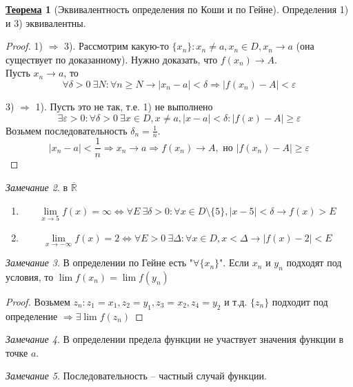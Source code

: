 \documentclass[12pt]{article}
\newenvironment{MyList}[1][4pt]{
  \begin{enumerate}[1.]
  \setlength{\parskip}{0pt}
  \setlength{\itemsep}{#1}
}{       
  \end{enumerate}
}
\def\R{\mathbb{R}}       %
\def\SO{\Rightarrow}     %
\def\EQ{\Leftrightarrow} %
\def\Pagebreak{\pagebreak\vspace*{-1.5em}}
\theoremstyle{definition} %
\newtheorem{Thm}{\underline{Теорема}}[subsection] %
\theoremstyle{plain} %
\theoremstyle{remark} %
\newtheorem{Rem}[Thm]{Замечание} %
\begin{document}
\Pagebreak
\begin{Thm}[Эквивалентность определения по Коши и по Гейне]
    Определения 1) и 3) эквивалентны.
\end{Thm}

\begin{proof}
    1) $\SO$ 3). Рассмотрим какую-то $\{x_n\} : x_n \neq a, x_n \in D, x_n \to a$ (она существует по доказанному).
    Нужно доказать, что $f(x_n) \to A$.  \\
    Пусть $x_n \to a$, то 
    \[\forall \delta > 0 \ \exists N : \forall n \geqslant N \to |x_n - a| < \delta \SO |f(x_n) - A| < \varepsilon\]

    3) $\SO$ 1). Пусть это не так, т.е. 1) не выполнено
    \[\exists \varepsilon > 0 : \forall \delta > 0 \ \exists x \in D, x \neq a, |x - a| < \delta: |f(x) - A| \geqslant \varepsilon\]
    Возьмем последовательность $\delta_n = \frac{1}{n}$.
    \[|x_n - a| < \frac{1}{n} \SO x_n \to a \SO f(x_n) \to A, \text{ но } |f(x_n) - A| \geqslant \varepsilon\] 
\end{proof}

\begin{Rem}
    в $\overline{\R}$ 
    \begin{MyList}
        \item \[\lim_{x \to 5} f(x) = \infty \EQ \forall E \ \exists \delta > 0 : \forall x \in D \setminus \{5\}, |x - 5| < \delta \to f(x) > E\]
        \item \[\lim_{x \to -\infty} f(x) = 2 \EQ \forall E > 0 \ \exists \Delta : \forall x \in D, x < \Delta \to |f(x) - 2| < E\]
    \end{MyList}
\end{Rem}

\begin{Rem}
    В определении по Гейне есть "$\forall \{x_n\}$". Если $x_n$ и $y_n$ подходят под условия, то $\lim f(x_n) = \lim f(y_n)$ 
\end{Rem}

\begin{proof}
    Возьмем $z_n: z_1 = x_1, z_2 = y_1, z_3 = x_2, z_4 = y_2$ и т.д. $\{z_n\}$ подходит под определение $\SO \exists \lim f(z_n)$ 
\end{proof}

\begin{Rem}
    В определении предела функции не участвует значения функции в точке $a$.
\end{Rem}

\begin{Rem}
    Последовательность -- частный случай функции.
\end{Rem}
\end{document}
